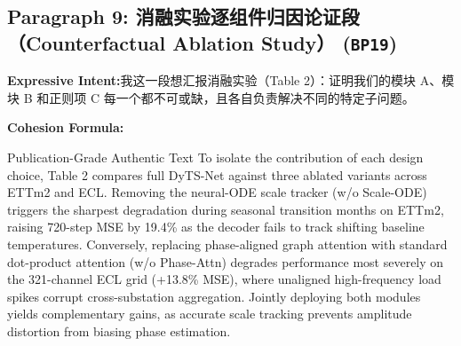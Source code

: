\subsection*{Paragraph 9: 消融实验逐组件归因论证段（Counterfactual Ablation Study） (\texttt{BP19})}
\noindent\textbf{Expressive Intent:}\enspace 我这一段想汇报消融实验（Table 2）：证明我们的模块 A、模块 B 和正则项 C 每一个都不可或缺，且各自负责解决不同的特定子问题。\par
\noindent\textbf{Cohesion Formula:}\par\vspace{4pt}
\begin{ExampleBox}{Publication-Grade Authentic Text}
To isolate the contribution of each design choice, Table 2 compares full DyTS-Net against three ablated variants across ETTm2 and ECL. Removing the neural-ODE scale tracker (w/o Scale-ODE) triggers the sharpest degradation during seasonal transition months on ETTm2, raising 720-step MSE by 19.4\% as the decoder fails to track shifting baseline temperatures. Conversely, replacing phase-aligned graph attention with standard dot-product attention (w/o Phase-Attn) degrades performance most severely on the 321-channel ECL grid (+13.8\% MSE), where unaligned high-frequency load spikes corrupt cross-substation aggregation. Jointly deploying both modules yields complementary gains, as accurate scale tracking prevents amplitude distortion from biasing phase estimation.
\end{ExampleBox}
